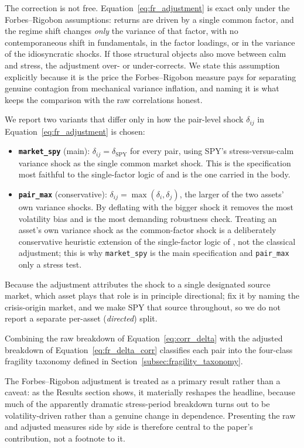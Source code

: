 The correction is not free. Equation~\eqref{eq:fr_adjustment} is exact only under the Forbes--Rigobon assumptions: returns are driven by a single common factor, and the regime shift changes \emph{only} the variance of that factor, with no contemporaneous shift in fundamentals, in the factor loadings, or in the variance of the idiosyncratic shocks. If those structural objects also move between calm and stress, the adjustment over- or under-corrects. We state this assumption explicitly because it is the price the Forbes--Rigobon measure pays for separating genuine contagion from mechanical variance inflation, and naming it is what keeps the comparison with the raw correlations honest.

We report two variants that differ only in how the pair-level shock $\delta_{ij}$ in Equation~\eqref{eq:fr_adjustment} is chosen:
\begin{itemize}
  \item \textbf{\texttt{market\_spy}} (main): $\delta_{ij} = \delta_{\mathrm{SPY}}$ for every pair, using SPY's stress-versus-calm variance shock as the single common market shock. This is the specification most faithful to the single-factor logic of \citet{forbesrigobon2002} and is the one carried in the body.
  \item \textbf{\texttt{pair\_max}} (conservative): $\delta_{ij} = \max(\delta_i, \delta_j)$, the larger of the two assets' own variance shocks. By deflating with the bigger shock it removes the most volatility bias and is the most demanding robustness check. Treating an asset's own variance shock as the common-factor shock is a deliberately conservative heuristic extension of the single-factor logic of \citet{forbesrigobon2002}, not the classical adjustment; this is why \texttt{market\_spy} is the main specification and \texttt{pair\_max} only a stress test.
\end{itemize}
Because the adjustment attributes the shock to a single designated source market, which asset plays that role is in principle directional; \citet{forbesrigobon2002} fix it by naming the crisis-origin market, and we make SPY that source throughout, so we do not report a separate per-asset (\emph{directed}) split.

Combining the raw breakdown of Equation~\eqref{eq:corr_delta} with the adjusted breakdown of Equation~\eqref{eq:fr_delta_corr} classifies each pair into the four-class fragility taxonomy defined in Section~\ref{subsec:fragility_taxonomy}.

The Forbes--Rigobon adjustment is treated as a primary result rather than a caveat: as the Results section shows, it materially reshapes the headline, because much of the apparently dramatic stress-period breakdown turns out to be volatility-driven rather than a genuine change in dependence. Presenting the raw and adjusted measures side by side is therefore central to the paper's contribution, not a footnote to it.

